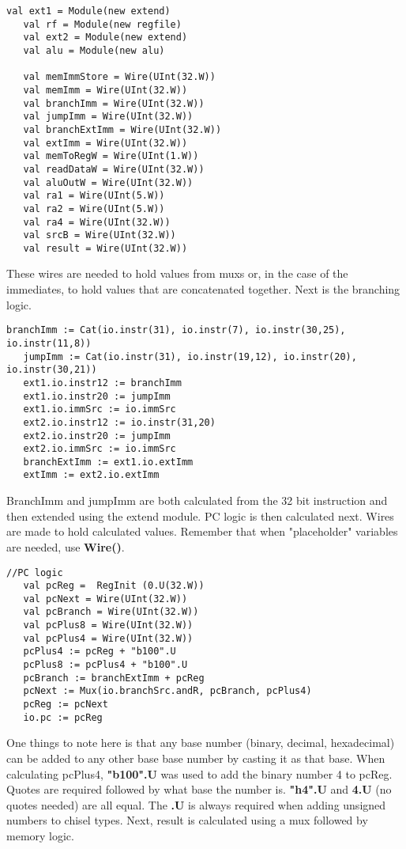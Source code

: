 \documentclass[12pt, letterpaper]{report}
\begin{document}
\begin{lstlisting}[style=scala]
   val ext1 = Module(new extend)
   val rf = Module(new regfile)
   val ext2 = Module(new extend)
   val alu = Module(new alu)

   val memImmStore = Wire(UInt(32.W))
   val memImm = Wire(UInt(32.W))
   val branchImm = Wire(UInt(32.W))
   val jumpImm = Wire(UInt(32.W))
   val branchExtImm = Wire(UInt(32.W))
   val extImm = Wire(UInt(32.W))
   val memToRegW = Wire(UInt(1.W))
   val readDataW = Wire(UInt(32.W))
   val aluOutW = Wire(UInt(32.W))
   val ra1 = Wire(UInt(5.W))
   val ra2 = Wire(UInt(5.W))
   val ra4 = Wire(UInt(32.W))
   val srcB = Wire(UInt(32.W))
   val result = Wire(UInt(32.W))
\end{lstlisting}

These wires are needed to hold values from muxs or, in the case of the immediates, to hold values that are concatenated together.
Next is the branching logic.

\begin{lstlisting}[style=scala]
   branchImm := Cat(io.instr(31), io.instr(7), io.instr(30,25), io.instr(11,8))
   jumpImm := Cat(io.instr(31), io.instr(19,12), io.instr(20), io.instr(30,21))
   ext1.io.instr12 := branchImm
   ext1.io.instr20 := jumpImm
   ext1.io.immSrc := io.immSrc
   ext2.io.instr12 := io.instr(31,20) 
   ext2.io.instr20 := jumpImm
   ext2.io.immSrc := io.immSrc
   branchExtImm := ext1.io.extImm
   extImm := ext2.io.extImm
\end{lstlisting}

BranchImm and jumpImm are both calculated from the 32 bit instruction and then extended using the extend module.
PC logic is then calculated next. Wires are made to hold calculated values. Remember that when "placeholder" variables are
needed, use \textbf{Wire()}.
 
\begin{lstlisting}[style=scala]
   //PC logic
   val pcReg =  RegInit (0.U(32.W))
   val pcNext = Wire(UInt(32.W))
   val pcBranch = Wire(UInt(32.W))
   val pcPlus8 = Wire(UInt(32.W))
   val pcPlus4 = Wire(UInt(32.W))
   pcPlus4 := pcReg + "b100".U
   pcPlus8 := pcPlus4 + "b100".U
   pcBranch := branchExtImm + pcReg
   pcNext := Mux(io.branchSrc.andR, pcBranch, pcPlus4)
   pcReg := pcNext
   io.pc := pcReg
\end{lstlisting}

One things to note here is that any base number (binary, decimal, hexadecimal) can be added to 
any other base base number by casting it as that base. When calculating pcPlus4, \textbf{"b100".U}
was used to add the binary number 4 to pcReg. Quotes are required followed by what base the number is.
\textbf{"h4".U} and \textbf{4.U} (no quotes needed) are all equal. The \textbf{.U} is always required when 
adding unsigned numbers to chisel types. Next, result is calculated using a mux followed by memory logic.
\end{document}
